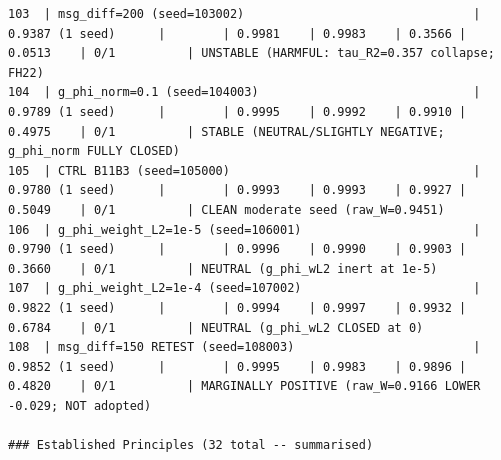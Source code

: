 \begin{tiny}
\begin{verbatim}
103  | msg_diff=200 (seed=103002)                                | 0.9387 (1 seed)      |        | 0.9981    | 0.9983    | 0.3566 | 0.0513    | 0/1          | UNSTABLE (HARMFUL: tau_R2=0.357 collapse; FH22)
104  | g_phi_norm=0.1 (seed=104003)                              | 0.9789 (1 seed)      |        | 0.9995    | 0.9992    | 0.9910 | 0.4975    | 0/1          | STABLE (NEUTRAL/SLIGHTLY NEGATIVE; g_phi_norm FULLY CLOSED)
105  | CTRL B11B3 (seed=105000)                                  | 0.9780 (1 seed)      |        | 0.9993    | 0.9993    | 0.9927 | 0.5049    | 0/1          | CLEAN moderate seed (raw_W=0.9451)
106  | g_phi_weight_L2=1e-5 (seed=106001)                        | 0.9790 (1 seed)      |        | 0.9996    | 0.9990    | 0.9903 | 0.3660    | 0/1          | NEUTRAL (g_phi_wL2 inert at 1e-5)
107  | g_phi_weight_L2=1e-4 (seed=107002)                        | 0.9822 (1 seed)      |        | 0.9994    | 0.9997    | 0.9932 | 0.6784    | 0/1          | NEUTRAL (g_phi_wL2 CLOSED at 0)
108  | msg_diff=150 RETEST (seed=108003)                         | 0.9852 (1 seed)      |        | 0.9995    | 0.9983    | 0.9896 | 0.4820    | 0/1          | MARGINALLY POSITIVE (raw_W=0.9166 LOWER -0.029; NOT adopted)

### Established Principles (32 total -- summarised)


\end{verbatim}
\end{tiny}
